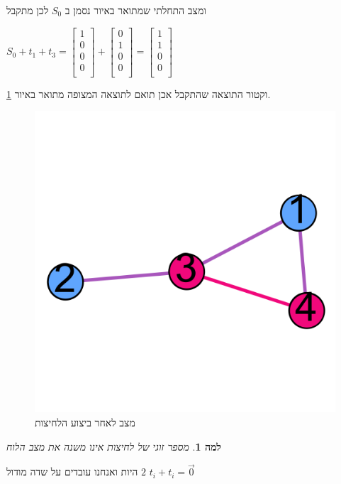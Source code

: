 \documentclass[12pt,twoside]{article}
\newtheorem{lemma}{למה}[section]
\begin{document}
ומצב התחלתי שמתואר באיור נסמן ב
$S_0$
לכן מתקבל

$
    S_0 + t_1 + t_3 = 
    \begin{bmatrix}
        1 \\
        0 \\
        0 \\
        0 \\
    \end{bmatrix}
    +
    \begin{bmatrix}
        0 \\
        1 \\
        0 \\
        0 \\
    \end{bmatrix}
    =
    \begin{bmatrix}
        1 \\
        1 \\
        0 \\
        0 \\
    \end{bmatrix}
$

וקטור התוצאה שהתקבל אכן תואם לתוצאה המצופה
מתואר באיור 
\ref{fig:start graph presses solution}.

\begin{figure}[ht]
    \caption{מצב לאחר ביצוע הלחיצות}
    \label{fig:start graph presses solution}
    \centering
    \includegraphics[width=.7\textwidth,height=.7\textheight,keepaspectratio]{images/graph_presses_solve.png}
\end{figure}

\begin{lemma}
    \label{lemma: sum same change vect}
    מספר זוגי של לחיצות אינו משנה את מצב הלוח
\end{lemma}
היות 
ואנחנו עובדים על שדה מודול 
$2$
$t_i + t_i = \vec{0}$
\end{document}
